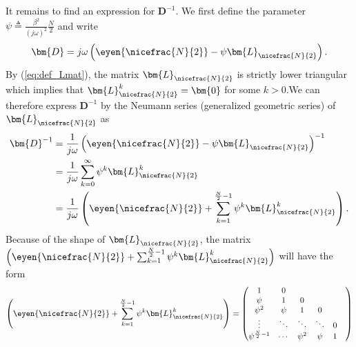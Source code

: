 It remains to find an expression for $\bm{D}^{-1}$. We first define the parameter $\psi \triangleq \frac{\beta^2}{(j\omega)^2}\frac{N}{2}$ and write
\begin{equation}
    \bm{D} = j\omega \left( \eyen{\nicefrac{N}{2}} - \psi \bm{L}_{\nicefrac{N}{2}} \right).
\end{equation}
By (\ref{eq:def_Lmat}), the matrix $\bm{L}_{\nicefrac{N}{2}}$ is strictly lower triangular which implies that $\bm{L}_{\nicefrac{N}{2}}^k = \bm{0}$ for some $k>0$.We can therefore express $\bm{D}^{-1}$ by the Neumann series (generalized geometric series) of $\bm{L}_{\nicefrac{N}{2}}$ as
\begin{align}
    \bm{D}^{-1} & = \frac{1}{j\omega} \left( \eyen{\nicefrac{N}{2}} - \psi \bm{L}_{\nicefrac{N}{2}} \right)^{-1} \\
                & = \frac{1}{j\omega} \sum_{k=0}^{\infty}\psi^k \bm{L}_{\nicefrac{N}{2}}^k \label{eq:Dinv_Neumann} \\
                & = \frac{1}{j\omega} \left( \eyen{\nicefrac{N}{2}} + \sum_{k=1}^{\frac{N}{2}-1}\psi^k \bm{L}_{\nicefrac{N}{2}}^k \right).
\end{align}
Because of the shape of $\bm{L}_{\nicefrac{N}{2}}$, the matrix $\left( \eyen{\nicefrac{N}{2}} + \sum_{k=1}^{\frac{N}{2}-1}\psi^k \bm{L}_{\nicefrac{N}{2}}^k \right)$ will have the form
\begin{equation}
    \left( \eyen{\nicefrac{N}{2}} + \sum_{k=1}^{\frac{N}{2}-1}\psi^k \bm{L}_{\nicefrac{N}{2}}^k \right) =
    \begin{pmatrix}
        1 & 0 &  & & &   \\
        \psi & 1 & 0 &  & & \\
        \psi^2 & \psi & 1 & 0 &  &  \\
        \vdots & \ddots & \ddots  & \ddots &  0 \\
        \psi^{\frac{N}{2}-1} & \cdots & \psi^2 & \psi & 1
    \end{pmatrix}
\end{equation}

